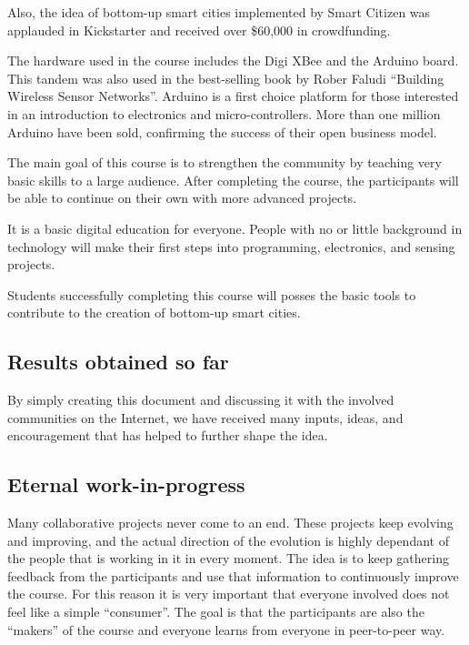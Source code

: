 \documentclass[a4paper,oneside]{book}   %
\begin{document}
Also, the idea of bottom-up smart cities implemented by Smart Citizen was applauded in Kickstarter and received over \$60,000 in crowdfunding. 

The hardware used in the course includes the Digi XBee and the Arduino board. 
This tandem was also used in the best-selling book by Rober Faludi ``Building Wireless Sensor Networks''.
Arduino is a first choice platform for those interested in an introduction to electronics and micro-controllers.
More than one million Arduino have been sold, confirming the success of their open business model.

The main goal of this course is to strengthen the community by teaching very basic skills to a large audience. After completing the course, the participants will be able to continue on their own with more advanced projects. 

It is a basic digital education for everyone. People with no or little background in technology will make their first steps into programming, electronics, and sensing projects.

Students successfully completing this course will posses the basic tools to contribute to the creation of bottom-up smart cities.

\subsection{Results obtained so far}

By simply creating this document and discussing it with the involved communities on the Internet, we have received many inputs, ideas, and encouragement that has helped to further shape the idea.

\subsection{Eternal work-in-progress}

Many collaborative projects never come to an end.
These projects keep evolving and improving, and the actual direction of the evolution is highly dependant of the people that is working in it in every moment.
The idea is to keep gathering feedback from the participants and use that information to continuously improve the course.
For this reason it is very important that everyone involved does not feel like a simple ``consumer''.
The goal is that the participants are also the ``makers'' of the course and everyone learns from everyone in peer-to-peer way.
\end{document}
